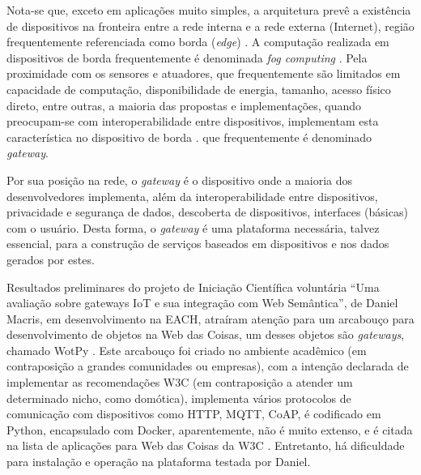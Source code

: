 Nota-se que, exceto em aplicações muito simples, a arquitetura prevê a existência de dispositivos na fronteira entre a rede interna e a rede externa (Internet), região frequentemente referenciada como borda (\textit{edge}) \cite{EdgeComputing}. A computação realizada em dispositivos de borda frequentemente é denominada \textit{fog computing} \cite{FogComputing}. Pela proximidade com os sensores e atuadores, que frequentemente são limitados em capacidade de computação, disponibilidade de energia, tamanho, acesso físico direto, entre outras, a maioria das propostas e implementações, quando preocupam-se com interoperabilidade entre dispositivos, implementam esta característica no dispositivo de borda \cite{Stirbu2008} \cite{Gyrard2017}. \cite{GARCIAMANGAS2019235} que frequentemente é denominado \textit{gateway}. 

Por sua posição na rede, o \textit{gateway} é o dispositivo onde a maioria dos desenvolvedores implementa, além da interoperabilidade entre dispositivos, privacidade e segurança de dados, descoberta de dispositivos, interfaces (básicas) com o usuário. Desta forma, o \textit{gateway} é uma plataforma necessária, talvez essencial, para a construção de serviços baseados em dispositivos e nos dados gerados por estes.



Resultados preliminares do projeto de Iniciação Científica voluntária ``Uma avaliação sobre gateways IoT e sua integração com Web Semântica'', de Daniel Macris, em desenvolvimento na EACH, atraíram atenção para um arcabouço para desenvolvimento de objetos na Web das Coisas, um desses objetos são \textit{gateways}, chamado WotPy \cite{GARCIAMANGAS2019235}. Este arcabouço foi criado no ambiente acadêmico (em contraposição a grandes comunidades ou empresas), com a intenção declarada de implementar as recomendações W3C (em contraposição a atender um determinado nicho, como domótica), implementa vários protocolos de comunicação com dispositivos como HTTP, MQTT, CoAP, é codificado em Python, encapsulado com Docker, aparentemente, não é muito extenso, e é citada na lista de aplicações para Web das Coisas da W3C \cite{WoTDevTools}. Entretanto, há dificuldade para instalação e operação na plataforma testada por Daniel.

